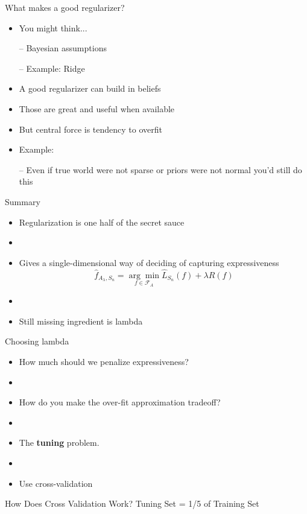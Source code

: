 \documentclass{beamer}
\begin{document}
\begin{frame}{What makes a good regularizer?}
	\begin{itemize}
		\item You might think...
		
		– Bayesian assumptions 
		
		– Example: Ridge
		\item A good regularizer can build in beliefs
		\item Those are great and useful when available
		\item But central force is tendency to overfit
		\item Example:
		
		– Even if true world were not sparse or priors were not normal you’d still do this
	\end{itemize}
\end{frame}

\begin{frame}{Summary}
	\begin{itemize}
		\item Regularization is one half of the secret sauce
		\item[]
		\item Gives a single-dimensional way of deciding of capturing expressiveness
			$$\hat{f}_{A_\lambda,S_n}=\underset{f \in \mathcal{F}_A}{\arg\min}\hat{L}_{S_n}(f)+\lambda R(f)$$		
		\item[]	
		\item Still missing ingredient is lambda
	\end{itemize}
\end{frame}

\begin{frame}{Choosing lambda}
	\begin{itemize}
		\item How much should we penalize expressiveness?
		\item[]
		\item How do you make the over-fit approximation tradeoff?	
		\item[]
		\item The \textbf{tuning} problem.
		\item[]
		\item Use cross-validation
	\end{itemize}
\end{frame}

\begin{frame}{How Does Cross Validation Work?}
		Tuning Set = 1/5 of Training Set
\end{frame}
\end{document}
